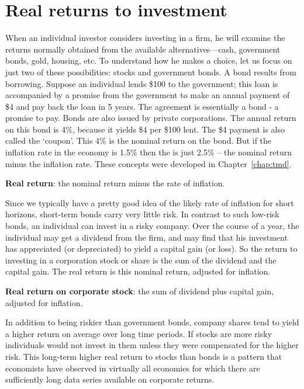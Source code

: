 \section{Real returns to investment}\label{sec:ch7sec5}

When an individual investor considers investing in a firm, he will examine the returns normally obtained from the available alternatives---cash, government bonds, gold, housing, etc. To understand how he makes a choice, let us focus on just two of these possibilities: stocks and government bonds. A bond results from borrowing. Suppose an individual lends \$100 to the government; this loan is accompanied by a promise from the government to make an annual payment of \$4 and pay back the loan in 5 years. The agreement is essentially a bond - a promise to pay. Bonds are also issued by private corporations. The annual return on this bond is 4\%, because it yields \$4 per \$100 lent. The \$4 payment is also called the `coupon'. This 4\% is the nominal return on the bond. But if the inflation rate in the economy is 1.5\% then the  is just 2.5\% -- the nominal return minus the inflation rate. These concepts were developed in Chapter~\ref{chap:tmd}.

\begin{DefBox}
\textbf{Real return}: the nominal return minus the rate of inflation.
\end{DefBox}

Since we typically have a pretty good idea of the likely rate of inflation for short horizons, short-term bonds carry very little risk. In contrast to such low-risk bonds, an individual can invest in a risky company. Over the course of a year, the individual may get a dividend from the firm, and may find that his investment has appreciated (or depreciated) to yield a capital gain (or loss). So the return to investing in a corporation stock or share is the sum of the dividend and the capital gain. The real return is this nominal return, adjusted for inflation.

\begin{DefBox}
\textbf{Real return on corporate stock}: the sum of dividend plus capital gain, adjusted for inflation.
\end{DefBox}

In addition to being riskier than government bonds, company shares tend to yield a higher return on average over long time periods. If stocks are more risky individuals would not invest in them unless they were compensated for the higher risk. This long-term higher real return to stocks than bonds is a pattern that economists have observed in virtually all economies for which there are sufficiently long data series available on corporate returns.  


